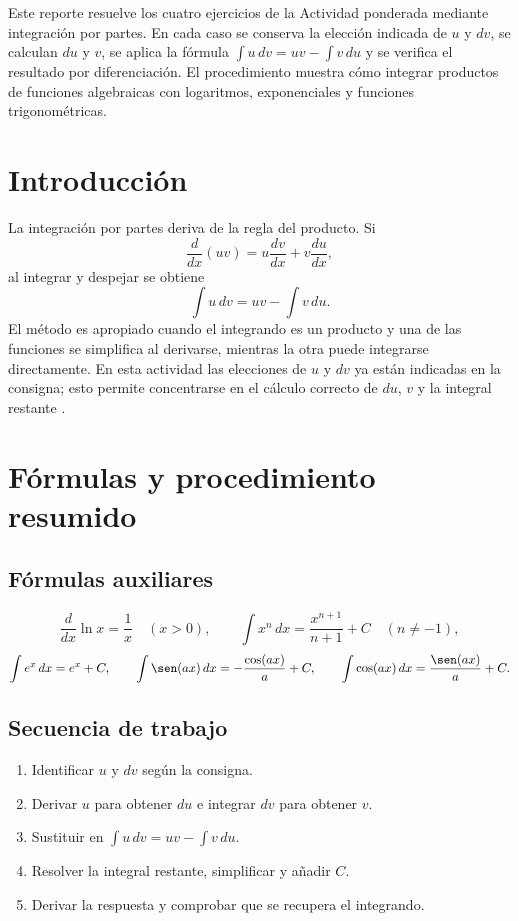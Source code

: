 \begin{abstractd}
Este reporte resuelve los cuatro ejercicios de la Actividad ponderada mediante integración por partes. En cada caso se conserva la elección indicada de $u$ y $dv$, se calculan $du$ y $v$, se aplica la fórmula $\int u\,dv=uv-\int v\,du$ y se verifica el resultado por diferenciación. El procedimiento muestra cómo integrar productos de funciones algebraicas con logaritmos, exponenciales y funciones trigonométricas.
\end{abstractd}

\templateIndex

\section{Introducción}
La integración por partes deriva de la regla del producto. Si
\[
 \frac{d}{dx}(uv)=u\frac{dv}{dx}+v\frac{du}{dx},
\]
al integrar y despejar se obtiene
\[
 \boxed{\int u\,dv=uv-\int v\,du}.
\]
El método es apropiado cuando el integrando es un producto y una de las funciones se simplifica al derivarse, mientras la otra puede integrarse directamente. En esta actividad las elecciones de $u$ y $dv$ ya están indicadas en la consigna; esto permite concentrarse en el cálculo correcto de $du$, $v$ y la integral restante \citep{stewart2016calculus,openstax2016calculus2}.

\section{Fórmulas y procedimiento resumido}
\subsection{Fórmulas auxiliares}
\[
 \frac{d}{dx}\ln x=\frac1x\quad(x>0),\qquad
 \int x^n\,dx=\frac{x^{n+1}}{n+1}+C\quad(n\neq-1),
\]
\[
 \int e^x\,dx=e^x+C,
 \qquad \int\sen(ax)\,dx=-\frac{\cos(ax)}{a}+C,
 \qquad \int\cos(ax)\,dx=\frac{\sen(ax)}{a}+C.
\]

\subsection{Secuencia de trabajo}
\begin{enumerate}
  \item Identificar $u$ y $dv$ según la consigna.
  \item Derivar $u$ para obtener $du$ e integrar $dv$ para obtener $v$.
  \item Sustituir en $\int u\,dv=uv-\int v\,du$.
  \item Resolver la integral restante, simplificar y añadir $C$.
  \item Derivar la respuesta y comprobar que se recupera el integrando.
\end{enumerate}

